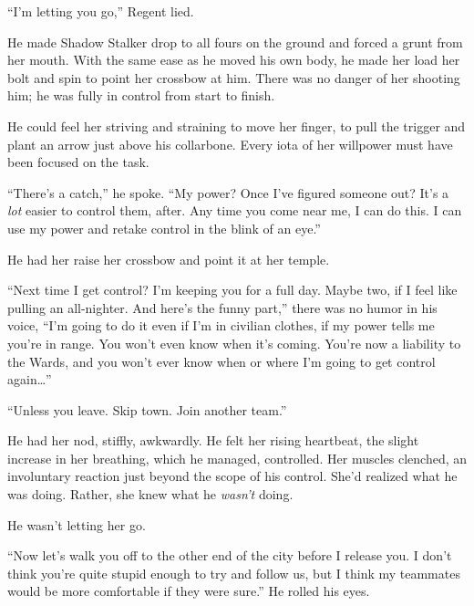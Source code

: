 





``I'm letting you go,'' Regent lied.



He made Shadow Stalker drop to all fours on the ground and forced a grunt from her mouth.  With the same ease as he moved his own body, he made her load her bolt and spin to point her crossbow at him.  There was no danger of her shooting him; he was fully in control from start to finish.



He could feel her striving and straining to move her finger, to pull the trigger and plant an arrow just above his collarbone.  Every iota of her willpower must have been focused on the task.



``There's a catch,'' he spoke. ``My power?  Once I've figured someone out?  It's a \emph{lot} easier to control them, after.  Any time you come near me, I can do this.  I can use my power and retake control in the blink of an eye.''



He had her raise her crossbow and point it at her temple.



``Next time I get control?  I'm keeping you for a full day.  Maybe two, if I feel like pulling an all-nighter.  And here's the funny part,'' there was no humor in his voice, ``I'm going to do it even if I'm in civilian clothes, if my power tells me you're in range.  You won't even know when it's coming.  You're now a liability to the Wards, and you won't ever know when or where I'm going to get control again\ldots''



``Unless you leave.  Skip town.  Join another team.''



He had her nod, stiffly, awkwardly.  He felt her rising heartbeat, the slight increase in her breathing, which he managed, controlled.  Her muscles clenched, an involuntary reaction just beyond the scope of his control.  She'd realized what he was doing.  Rather, she knew what he \emph{wasn't} doing.



He wasn't letting her go.



``Now let's walk you off to the other end of the city before I release you.  I don't think you're quite stupid enough to try and follow us, but I think my teammates would be more comfortable if they were sure.''  He rolled his eyes.



